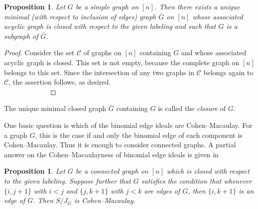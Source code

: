 \documentclass[11pt]{amsart}
\newtheorem{Proposition}[Theorem]{Proposition}
\begin{document}
\begin{Proposition}
\label{closure}
Let $G$ be a simple graph on $[n]$. Then there exists a unique minimal (with respect to inclusion of edges)  graph $\bar{G}$  on $[n]$ whose associated acyclic graph is closed  with respect to the given labeling and  such that $G$ is a subgraph of $\bar{G}$.
\end{Proposition}

\begin{proof}
 Consider the set $\mathcal{C}$  of  graphs on $[n]$ containing $G$ and whose associated acyclic graph is closed. This set is  not empty, because the complete graph on $[n]$ belongs to this set. Since the intersection of any two  graphs in $\mathcal{C}$  belongs again to $\mathcal{C}$, the assertion follows, as desired.
\, \, \, \, \, \, \, \, \, \,
\, \, \, \, \, \, \, \, \, \,
\, \, \, \, \, \, \, \, \, \,
\, \, \, \, \, \, \, \, \, \,
\, \, \, \, \, \, \, \, \, \,
\, \, \, \,
\end{proof}

The unique  minimal closed graph $\bar{G}$ containing $G$ is called the {\em closure} of $G$.

\medskip
One  basic question is which of the binomial edge ideals  are Cohen--Macaulay. For a graph $G$,  this is the case if and only the binomial edge of each component is Cohen--Macaulay. Thus it is enough to consider connected graphs.   A partial answer on  the Cohen--Macaulayness of binomial edge ideals  is given in

\begin{Proposition}
\label{cmbinomial}
Let $G$ be a  connected graph on $[n]$ which  is closed with respect to the given labeling. Suppose further that  $G$ satisfies the condition that whenever  $\{i,j+1\}$ with $i<j$ and $\{j,k+1\}$ with $j<k$ are edges of $G$,  then $\{i,k+1\}$ is an edge of $G$. Then $S/J_G$ is Cohen--Macaulay.
\end{Proposition}
\end{document}
